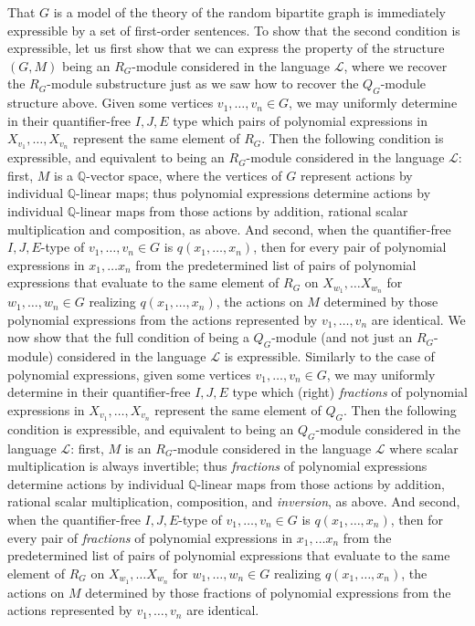 \documentclass{amsart}
\theoremstyle{definition}
\theoremstyle{remark}
\numberwithin{equation}{section}
\begin{document}
That $G$ is a model of the theory of the random bipartite graph is immediately expressible by a set of first-order sentences. To show that the second condition is expressible, let us first show that we can express the property of the structure $(G, M)$ being an $R_{G}$-module considered in the language $\mathcal{L}$, where we recover the $R_{G}$-module substructure just as we saw how to recover the $Q_{G}$-module structure above. Given some vertices $v_{1}, \ldots, v_{n} \in G$, we may uniformly determine in their quantifier-free $I, J, E$ type which pairs of polynomial expressions in $X_{v_{1}}, \ldots, X_{v_{n}}$ represent the same element of $R_{G}$. Then the following condition is expressible, and equivalent to being an $R_{G}$-module considered in the language $\mathcal{L}$: first, $M$ is a $\mathbb{Q}$-vector space, where the vertices of $G$ represent actions by individual $\mathbb{Q}$-linear maps; thus polynomial expressions determine actions by individual $\mathbb{Q}$-linear maps from those actions by addition, rational scalar multiplication and composition, as above. And second, when the quantifier-free $I, J, E$-type of $v_{1}, \ldots, v_{n} \in G$ is $q(x_{1}, \ldots, x_{n})$, then for every pair of polynomial expressions in $x_{1}, \ldots x_{n}$ from the predetermined list of pairs of polynomial expressions that evaluate to the same element of $R_{G}$ on $X_{w_{1}}, \ldots X_{w_{n}}$ for $w_{1}, \ldots, w_{n} \in G$ realizing $q(x_{1}, \ldots, x_{n})$, the actions on $M$ determined by those polynomial expressions from the actions represented by $v_{1}, \ldots, v_{n}$ are identical. We now show that the full condition of being a $Q_{G}$-module (and not just an $R_{G}$-module) considered in the language $\mathcal{L}$ is expressible. Similarly to the case of polynomial expressions, given some vertices $v_{1}, \ldots, v_{n} \in G$, we may uniformly determine in their quantifier-free $I, J, E$ type which (right) \textit{fractions} of polynomial expressions in $X_{v_{1}}, \ldots, X_{v_{n}}$ represent the same element of $Q_{G}$. Then the following condition is expressible, and equivalent to being an $Q_{G}$-module considered in the language $\mathcal{L}$: first, $M$ is an $R_{G}$-module considered in the language $\mathcal{L}$ where scalar multiplication is always invertible; thus \textit{fractions} of polynomial expressions determine actions by individual $\mathbb{Q}$-linear maps from those actions by addition, rational scalar multiplication, composition, and \textit{inversion}, as above. And second, when the quantifier-free $I, J, E$-type of $v_{1}, \ldots, v_{n} \in G$ is $q(x_{1}, \ldots, x_{n})$, then for every pair of \textit{fractions} of polynomial expressions in $x_{1}, \ldots x_{n}$ from the predetermined list of pairs of polynomial expressions that evaluate to the same element of $R_{G}$ on $X_{w_{1}}, \ldots X_{w_{n}}$ for $w_{1}, \ldots, w_{n} \in G$ realizing $q(x_{1}, \ldots, x_{n})$, the actions on $M$ determined by those fractions of polynomial expressions from the actions represented by $v_{1}, \ldots, v_{n}$ are identical.
\end{document}
